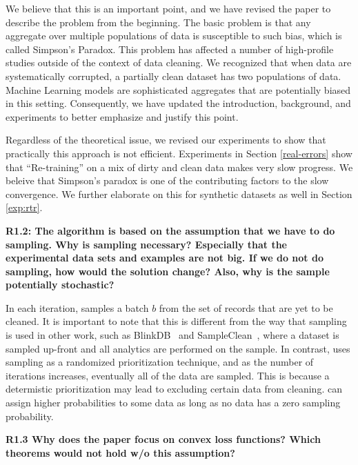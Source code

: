 \noindent We believe that this is an important point, and we have revised the paper to describe the problem from the beginning. The basic problem is that any aggregate over multiple populations of data is susceptible to such bias, which is called Simpson's Paradox. This problem has affected a number of high-profile studies outside of the context of data cleaning. We recognized that when data are systematically corrupted, a partially clean dataset has two populations of data. Machine Learning models are sophisticated aggregates that are potentially biased in this setting. Consequently, we have updated the introduction, background, and experiments to better emphasize and justify this point.

Regardless of the theoretical issue, we revised our experiments to show that practically this approach is not efficient. 
Experiments in Section \ref{real-errors} show that ``Re-training'' on a mix of dirty and clean data makes very slow progress. 
We beleive that Simpson's paradox is one of the contributing factors to the slow convergence.
We further elaborate on this for synthetic datasets as well in Section \ref{exp:rtr}.

\vspace{0.5em}

\noindent\textbf{R1.2: The algorithm is based on the assumption that we have to do sampling. Why is sampling necessary? Especially that the experimental data sets and examples are not big. If we do not do sampling, how would the solution change? Also, why is the sample potentially stochastic?}

\noindent In each iteration, \sys samples a batch $b$ from the set of records that are yet to be cleaned. It is important to note that this is different from the way that sampling is used in other work, such as BlinkDB~\cite{AgarwalMPMMS13} and SampleClean~\cite{wang1999sample}, where a dataset is sampled up-front and all analytics are performed on the sample.
In contrast, \sys uses sampling as a randomized prioritization technique, and as the number of iterations increases, eventually all of the data are sampled.
This is because a determistic prioritization may lead to excluding certain data from cleaning.
\sys can assign higher probabilities to some data as long as no data has a zero sampling probability. 

\vspace{0.5em}

\noindent\textbf{R1.3 Why does the paper focus on convex loss functions? Which theorems would not hold w/o this assumption?}

